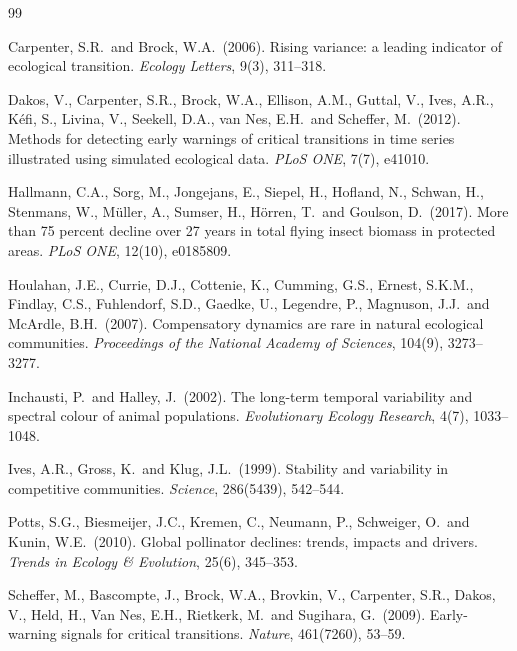 \documentclass[11pt]{article}
\begin{document}

\begin{thebibliography}{99}

Carpenter, S.R.\ and Brock, W.A.\ (2006). Rising variance: a leading
indicator of ecological transition. \emph{Ecology Letters}, 9(3), 311--318.

Dakos, V., Carpenter, S.R., Brock, W.A., Ellison, A.M., Guttal, V., Ives,
A.R., K\'efi, S., Livina, V., Seekell, D.A., van Nes, E.H.\ and Scheffer,
M.\ (2012). Methods for detecting early warnings of critical transitions
in time series illustrated using simulated ecological data. \emph{PLoS
ONE}, 7(7), e41010.

Hallmann, C.A., Sorg, M., Jongejans, E., Siepel, H., Hofland, N., Schwan,
H., Stenmans, W., M\"uller, A., Sumser, H., H\"orren, T.\ and Goulson, D.\
(2017). More than 75 percent decline over 27 years in total flying insect
biomass in protected areas. \emph{PLoS ONE}, 12(10), e0185809.

Houlahan, J.E., Currie, D.J., Cottenie, K., Cumming, G.S., Ernest,
S.K.M., Findlay, C.S., Fuhlendorf, S.D., Gaedke, U., Legendre, P.,
Magnuson, J.J.\ and McArdle, B.H.\ (2007). Compensatory dynamics are rare
in natural ecological communities. \emph{Proceedings of the National
Academy of Sciences}, 104(9), 3273--3277.

Inchausti, P.\ and Halley, J.\ (2002). The long-term temporal variability
and spectral colour of animal populations. \emph{Evolutionary Ecology
Research}, 4(7), 1033--1048.

Ives, A.R., Gross, K.\ and Klug, J.L.\ (1999). Stability and variability
in competitive communities. \emph{Science}, 286(5439), 542--544.

Potts, S.G., Biesmeijer, J.C., Kremen, C., Neumann, P., Schweiger, O.\ and
Kunin, W.E.\ (2010). Global pollinator declines: trends, impacts and
drivers. \emph{Trends in Ecology \& Evolution}, 25(6), 345--353.

Scheffer, M., Bascompte, J., Brock, W.A., Brovkin, V., Carpenter, S.R.,
Dakos, V., Held, H., Van Nes, E.H., Rietkerk, M.\ and Sugihara, G.\
(2009). Early-warning signals for critical transitions. \emph{Nature},
461(7260), 53--59.


\end{thebibliography}
\end{document}
